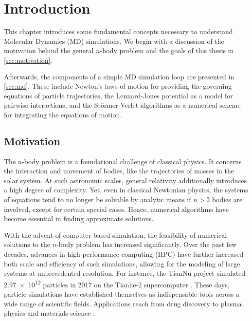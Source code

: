 \chapter[Introduction]{Introduction}
\label{cp:introduction}

{
	\parindent0pt
	This chapter introduces some fundamental concepts necessary to understand Molecular Dynamics (MD) simulations. We begin with a discussion of the motivation behind the general $n$-body problem and the goals of this thesis in \autoref{sec:motivation}.
	
	Afterwards, the components of a simple MD simulation loop are presented in \autoref{sec:md}. These include Newton’s laws of motion for providing the governing equations of particle trajectories, the Lennard-Jones potential as a model for pairwise interactions, and the Störmer-Verlet algorithms as a numerical scheme for integrating the equations of motion.
}



\section{Motivation}
\label{sec:motivation}

The $n$-body problem is a foundational challenge of classical physics. It  concerns the interaction and movement of bodies, like the trajectories of masses in the solar system. At such astronomic scales, general relativity additionally introduces a high degree of complexity. Yet, even in classical Newtonian physics, the systems of equations tend to no longer be solvable by analytic means if $n>2$ bodies are involved, except for certain special cases. Hence, numerical algorithms have become essential in finding approximate solutions. \cite{Arnold1985}

With the advent of computer-based simulation, the feasibility of numerical solutions to the $n$-body problem has increased significantly.
Over the past few decades, advances in high performance computing (HPC) have further increased both scale and efficiency of such simulations, allowing for the modeling of large systems at unprecedented resolution. For instance, the TianNu project simulated \num{2.97e12} particles in 2017 on the Tianhe-2 supercomputer \cite{Emberson2017}.
These days, particle simulations have established themselves as indispensable tools across a wide range of scientific fields. Applications reach from drug discovery \cite{Hollingsworth2018} to plasma physics \cite{Verboncoeur2005} and materials science \cite{Parteli2016}.

